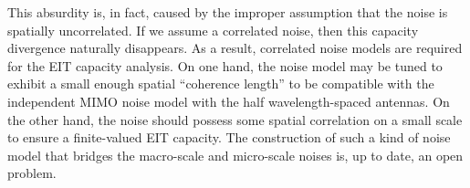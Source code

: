 \documentclass[journal,twocolumn]{IEEEtran}
\begin{document}
This absurdity is, in fact, caused by the improper assumption that the noise is spatially uncorrelated. 
If we assume a correlated noise, then this capacity divergence naturally disappears. 
As a result, correlated noise models are required for the EIT capacity analysis. On one hand, the noise model may be tuned to exhibit a small enough spatial ``coherence length'' to be compatible with the independent MIMO noise model with the half wavelength-spaced antennas. On the other hand, the noise should possess some spatial correlation on a small scale to ensure a finite-valued EIT capacity. 
The construction of such a kind of noise model that bridges the macro-scale and micro-scale noises is, up to date, an open problem. 


\end{document}
